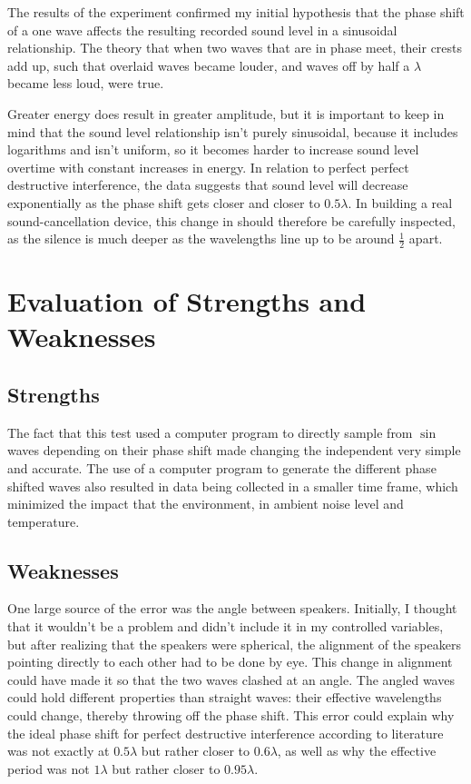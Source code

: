 \documentclass[index]{subfiles}
\begin{document}
The results of the experiment confirmed my initial hypothesis that the phase shift of a one wave affects the resulting recorded sound level in a sinusoidal relationship. The theory that when two waves that are in phase meet, their crests add up, such that overlaid waves became louder, and waves off by half a \(\lambda\) became less loud, were true.

Greater energy does result in greater amplitude, but it is important to keep in mind that the sound level relationship isn't purely sinusoidal, because it includes logarithms and isn't uniform, so it becomes harder to increase sound level overtime with constant increases in energy.
In relation to perfect perfect destructive interference, the data suggests that sound level will decrease exponentially as the phase shift gets closer and closer to \(0.5\lambda\). In building a real sound-cancellation device, this change in should therefore be carefully inspected, as the silence is much deeper as the wavelengths line up to be around \(\frac{1}{2}\) apart.

\section{Evaluation of Strengths and Weaknesses}

\subsection{Strengths}

The fact that this test used a computer program to directly sample from \(\sin\) waves depending on their phase shift made changing the independent very simple and accurate. The use of a computer program to generate the different phase shifted waves also resulted in data being collected in a smaller time frame, which minimized the impact that the environment, in ambient noise level and temperature.

\subsection{Weaknesses}

One large source of the error was the angle between speakers. Initially, I thought that it wouldn't be a problem and didn't include it in my controlled variables, but after realizing that the speakers were spherical, the alignment of the speakers pointing directly to each other had to be done by eye. This change in alignment could have made it so that the two waves clashed at an angle. The angled waves could hold different properties than straight waves: their effective wavelengths could change, thereby throwing off the phase shift. This error could explain why the ideal phase shift for perfect destructive interference according to literature was not exactly at \(0.5\lambda\) but rather closer to \(0.6\lambda\), as well as why the effective period was not \(1\lambda\) but rather closer to \(0.95\lambda\).
\end{document}
